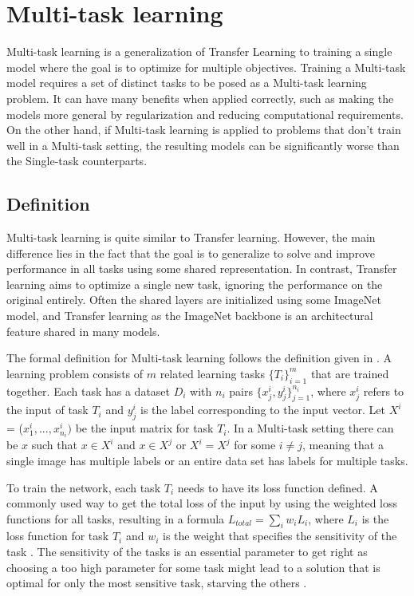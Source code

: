 \chapter{Multi-task learning}
Multi-task learning is a generalization of Transfer Learning to training a single model where the goal is to optimize for multiple objectives. 
Training a Multi-task model requires a set of distinct tasks to be posed as a Multi-task learning problem.
It can have many benefits when applied correctly, such as making the models more general by regularization and reducing computational requirements.
On the other hand, if Multi-task learning is applied to problems that don't train well in a Multi-task setting, the resulting models can be significantly worse than the Single-task counterparts.

\section{Definition}
Multi-task learning is quite similar to Transfer learning. 
However, the main difference lies in the fact that the goal is to generalize to solve and improve performance in all tasks using some shared representation. 
In contrast, Transfer learning aims to optimize a single new task, ignoring the performance on the original entirely. 
Often the shared layers are initialized using some ImageNet model, and Transfer learning as the ImageNet backbone is an architectural feature shared in many models.

The formal definition for Multi-task learning follows the definition given in \citep{surveyOnMultiTask}. 
A learning problem consists of ${m}$ related learning tasks ${\{T_i\}_{i=1}^m}$ that are trained together. 
Each task has a dataset ${D_i}$ with ${n_i}$ pairs ${\{x_{j}^{i}, y_{j}^{i}\}_{j=1}^{n_i}}$, where ${x_{j}^{i}}$ refers to the input of task ${T_i}$ and ${y_{j}^{i}}$ is the label corresponding to the input vector.
Let ${X^i}$ = (${x_{1}^{i}, ... , x_{n_i}^{i})}$ be the input matrix for task ${T_i}$.
In a Multi-task setting there can be ${x}$ such that ${x \in X^i}$ and ${x \in X^j}$ or ${X^i = X^j}$ for some ${i \ne j}$, meaning that a single image has multiple labels or an entire data set has labels for multiple tasks.

To train the network, each task ${T_i}$ needs to have its loss function defined.
A commonly used way to get the total loss of the input by using the weighted loss functions for all tasks, resulting in a formula ${L_{total} = \sum_i{w_i L_i}}$, where ${L_i}$ is the loss function for task ${T_i}$ and ${w_i}$ is the weight that specifies the sensitivity of the task \citep{usingUncertaintyToWeighLosses}. 
The sensitivity of the tasks is an essential parameter to get right as choosing a too high parameter for some task might lead to a solution that is optimal for only the most sensitive task, starving the others \citep{whichTasks}.

